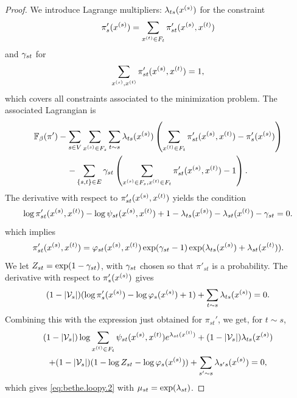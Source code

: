 \begin{proof}
We introduce Lagrange multipliers:
$\lambda_{ts}(x^{(s)})$ for the constraint 
$$
\pi'_{s}(x^{(s)}) = \sum_{x^{(t)}\in F_t} \pi'_{st}(x^{(s)}, x^{(t)})
$$
and $\gamma_{st}$ for 
$$
\sum_{x^{(s)}, x^{(t)}} \pi'_{st}(x^{(s)}, x^{(t)}) = 1,
$$
which covers all constraints associated to the minimization
problem. The associated Lagrangian is
\begin{multline*}
\mathbb F_\beta(\pi') - \sum_{s\in V}\sum_{x^{(s)}\in F_s} \sum_{t\sim s}
\lambda_{ts}(x^{(s)}) \left(\sum_{x^{(t)}\in F_t} \pi'_{st}(x^{(s)}, x^{(t)}) -
\pi'_s(x^{(s)})\right)\\
 - \sum_{\{s,t\} \in E} \gamma_{st}\left(\sum_{x^{(s)}\in F_s ,x^{(t)}\in F_t} \pi'_{st}(x^{(s)}, x^{(t)})
- 1\right).
\end{multline*}
The derivative with respect to $\pi'_{st}(x^{(s)}, x^{(t)})$ yields the
condition
$$
\log\pi'_{st}(x^{(s)}, x^{(t)}) - \log\psi_{st}(x^{(s)}, x^{(t)}) +1 -\lambda_{ts}(x^{(s)})
 - \lambda_{st}(x^{(t)}) -\gamma_{st}=0.
$$
which implies
\[
\pi'_{st}(x^{(s)}, x^{(t)}) = \varphi_{st}(x^{(s)}, x^{(t)})\exp(\gamma_{st}-1) \exp(\lambda_{ts}(x^{(s)})
 + \lambda_{st}(x^{(t)}) ).
 \]
 We let $Z_{st} = \exp(1-\gamma_{st})$, with $\gamma_{st}$ chosen so that $\pi'_{st}$ is a probability.
The derivative with respect to $\pi'_s(x^{(s)})$ gives
$$
(1-|{\mathcal V}_s|)(\log\pi'_s(x^{(s)}) - \log\varphi_s(x^{(s)}) +1)  + \sum_{t\sim
s}\lambda_{ts}(x^{(s)})  = 0.
$$
Combining this with the expression just obtained for $\pi_{st}'$, we
get, for $t\sim s$,
\begin{multline*}
(1-|{\mathcal V}_s|) \log\sum_{x^{(t)}\in F_t} \psi_{st}(x^{(s)}, x^{(t)}) e^{\lambda_{st}(x^{(t)})}
+ (1-|{\mathcal V}_s|) \lambda_{ts}(x^{(s)}) \\ + (1-|{\mathcal V}_s|) (1 -\log Z_{st} - \log\varphi_s(x^{(s)})) 
+ \sum_{s'\sim
s}\lambda_{s's}(x^{(s)}) =0,
\end{multline*}
which gives \cref{eq:bethe.loopy.2} with $\mu_{st} =
\exp(\lambda_{st})$. 
\end{proof}


